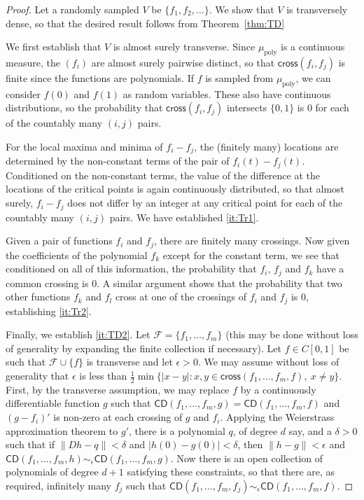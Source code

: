 \documentclass{daj}
\newcommand{\cross}{\mathsf{cross}}
\newcommand{\CD}{\mathsf{CD}}
\begin{document}
\begin{proof}
Let a randomly sampled $V$ be $\{f_1,f_2,\ldots\}$. We show that $V$ is
transversely dense, so that the desired
result follows from Theorem~\ref{thm:TD}

We first establish that $V$ is almost surely transverse.
Since $\mu_\text{poly}$ is a continuous measure, the $(f_i)$ are almost surely pairwise distinct, so that
$\cross(f_i,f_j)$ is finite since the functions are polynomials. If $f$ is sampled from $\mu_\text{poly}$,
we can consider $f(0)$ and $f(1)$ as random variables.
These also have continuous distributions, so the probability
that $\cross(f_i,f_j)$ intersects $\{0,1\}$ is 0 for each of the countably many $(i,j)$ pairs.

For the local maxima and minima of $f_i-f_j$, the (finitely many)
locations are determined by the non-constant terms of the
pair of $f_i(t)-f_j(t)$. Conditioned on the non-constant terms, the value of the difference at the locations of
the critical points is again continuously distributed, so that almost surely, $f_i-f_j$ does not
differ by an integer at any critical point for each of the countably many $(i,j)$ pairs.
We have established \ref{it:Tr1}.


Given a pair of functions $f_i$ and $f_j$, there are finitely many crossings. Now given the coefficients of the
polynomial $f_k$ except for the constant term, we see that conditioned
on all of this information, the probability
that $f_i$, $f_j$ and $f_k$ have a common crossing is 0.
A similar argument shows that the probability that two
other functions $f_k$ and $f_l$
cross at one of the crossings of $f_i$ and $f_j$ is 0, establishing \ref{it:Tr2}.

Finally, we establish \ref{it:TD2}.
Let $\mathcal F=\{f_1,\ldots,f_m\}$ (this may be done without loss of generality by expanding the finite
collection if necessary). Let $f\in C[0,1]$ be such that $\mathcal F\cup\{f\}$
 is transverse and let $\epsilon>0$.
We may assume without loss of generality that $\epsilon$ is less than $\frac 12\min\{|x-y|\colon
x,y\in \cross(f_1,\ldots,f_m,f),\ x\ne y\}$.
First, by the transverse assumption, we may replace $f$ by a
continuously differentiable function $g$ such that
$\CD(f_1,\ldots,f_m,g)=\CD(f_1,\ldots,f_m,f)$ and $(g-f_i)'$ is non-zero at each crossing of $g$ and $f_i$.
Applying the Weierstrass approximation theorem to $g'$,
there is a polynomial $q$, of degree $d$ say, and a $\delta>0$
such that if $\|Dh-q\|<\delta$ and $|h(0)-g(0)|<\delta$, then
$\|h-g\|<\epsilon$ and $\CD(f_1,\ldots,f_m,h)\sim_\epsilon
\CD(f_1,\ldots,f_m,g)$. Now there is an open collection of polynomials
of degree $d+1$ satisfying these constraints,
so that there are, as required, infinitely many $f_j$ such that $\CD(f_1,\ldots,f_m,f_j)\sim_\epsilon
\CD(f_1,\ldots,f_m,f)$.
\end{proof}
\end{document}
